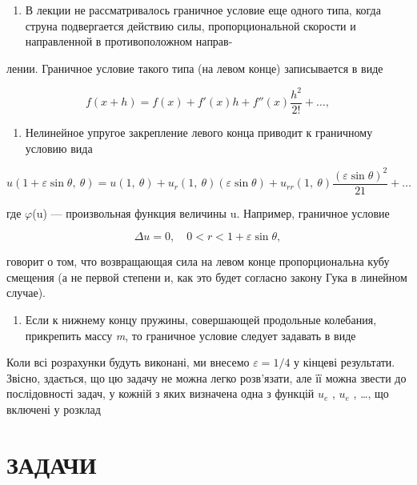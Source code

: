 \documentclass[
  ukrainian,
]{article}
\providecommand{\tightlist}{%
  \setlength{\itemsep}{0pt}\setlength{\parskip}{0pt}}
\begin{document}
\begin{enumerate}
\def\labelenumi{\arabic{enumi}.}
\tightlist
\item
  В лекции не рассматривалось граничное условие еще одного типа, когда
  струна подвергается действию силы, пропорциональной скорости и
  направленной в противоположном направ-
\end{enumerate}

лении. Граничное условие такого типа (на левом конце) записывается в
виде

\[
f(x+h) = f(x) + f'(x)h + f''(x)\frac{h^2}{2!} + \dots,
\]

\begin{enumerate}
\def\labelenumi{\arabic{enumi}.}
\setcounter{enumi}{1}
\tightlist
\item
  Нелинейное упругое закрепление левого конца приводит к граничному
  условию вида
\end{enumerate}

\[
u(1+\varepsilon\sin\theta,\ \theta)=u(1,\ \theta)+u_r(1,\ \theta)(\varepsilon\sin\theta)+u_{rr}(1,\ \theta)\frac{(\varepsilon\sin\theta)^2}{21}+\ldots
\]

где \(\varphi\)(u) --- произвольная функция величины u. Например,
граничное условие

\[
\Delta u = 0, \quad 0 < r < 1 + \varepsilon \sin \theta,
\]

говорит о том, что возвращающая сила на левом конце пропорциональна кубу
смещения (а не первой степени и, как это будет согласно закону Гука в
линейном случае).

\begin{enumerate}
\def\labelenumi{\arabic{enumi}.}
\setcounter{enumi}{2}
\tightlist
\item
  Если к нижнему концу пружины, совершающей продольные колебания,
  прикрепить массу \emph{m}, то граничное условие следует задавать в
  виде
\end{enumerate}

Коли всі розрахунки будуть виконані, ми внесемо \(\varepsilon=1/4\) у
кінцеві результати. Звісно, здається, що цю задачу не можна легко
розв'язати, але її можна звести до послідовності задач, у кожній з яких
визначена одна з функцій \(u_{\mathrm{ }e}\) , \(u_{\mathrm{ }e}\) ,
\ldots, що включені у розклад

\section{ЗАДАЧИ}\label{ux437ux430ux434ux430ux447ux438-5}
\end{document}
